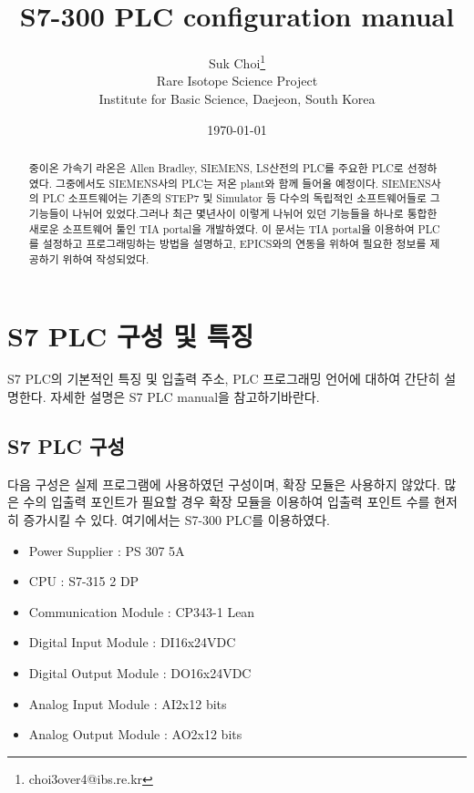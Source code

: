 \documentclass[11pt
  , a4paper
  , article
  , oneside
]{memoir}
\begin{document}
\newcommand{\technumber}{
  RAON Control-Document Series\\
  Revision : v1.0,   Release : September 24, 2014}
\title{\textbf{S7-300 PLC configuration manual}}

\author{Suk Choi\thanks{choi3over4@ibs.re.kr} \\

  Rare Isotope Science Project\\
  Institute for Basic Science, Daejeon, South Korea
}
\date{\today}

\renewcommand{\maketitlehooka}{\begin{flushright}\textsf{\technumber}\end{flushright}}

\maketitle

\begin{abstract}
중이온 가속기 라온은 Allen Bradley, SIEMENS, LS산전의 PLC를 주요한 PLC로 선정하였다. 그중에서도 SIEMENS사의 PLC는 저온 plant와 함께 들어올 예정이다. 
SIEMENS사의 PLC 소프트웨어는 기존의 STEP7 및 Simulator 등 다수의 독립적인 소프트웨어들로 그 기능들이 나뉘어 있었다.그러나 최근 몇년사이 이렇게 나뉘어 있던 기능들을 하나로 통합한 새로운 소프트웨어 툴인 TIA portal을 개발하였다. 이 문서는 TIA portal을 이용하여 PLC를 설정하고 프로그래밍하는 방법을 설명하고, EPICS와의 연동을 위하여 필요한 정보를 제공하기 위하여 작성되었다.
\end{abstract}

\chapter{S7 PLC 구성 및 특징}
S7 PLC의 기본적인 특징 및 입출력 주소, PLC 프로그래밍 언어에 대하여 간단히 설명한다. 자세한 설명은 S7 PLC manual을 참고하기바란다.

\section{S7 PLC 구성}
다음 구성은 실제 프로그램에 사용하였던 구성이며, 확장 모듈은 사용하지 않았다. 많은 수의 입출력 포인트가 필요할 경우 확장 모듈을 이용하여 입출력 포인트 수를 현저히 증가시킬 수 있다. 여기에서는 S7-300 PLC를 이용하였다.

\begin{itemize}
\item Power Supplier 	    : PS 307 5A
\item CPU 		    : S7-315 2 DP
\item Communication Module  : CP343-1 Lean
\item Digital Input Module  : DI16x24VDC
\item Digital Output Module : DO16x24VDC
\item Analog Input Module   : AI2x12 bits
\item Analog Output Module  : AO2x12 bits
\end{itemize}
\end{document}
